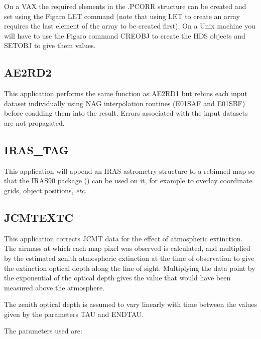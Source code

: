 On a VAX the required elements in the .PCORR structure can be created and
set using the Figaro LET command (note that using LET to create an array 
requires the last element of the array to be created first). On a Unix machine
you will have to use the Figaro command CREOBJ to create the HDS objects and
SETOBJ to give them values.


\goodbreak

\subsection{AE2RD2}

This application performs the same function as AE2RD1 but rebins each
input dataset individually using NAG interpolation routines (E01SAF
and E01SBF) before coadding them into the result. Errors associated
with the input datasets are not propagated.


\goodbreak

\subsection{IRAS\_TAG}

This application will append an IRAS astrometry structure to a 
rebinned map so that the IRAS90 package
() can be used on it,
for example to overlay coordinate grids, object positions, {\em etc}.


\goodbreak

\subsection{JCMTEXTC}

This application corrects JCMT data for the effect of  atmospheric
extinction. The airmass at which each map pixel was  observed is
calculated, and multiplied by the estimated zenith  atmospheric
extinction at the time of observation to give the  extinction optical
depth along the line of sight. Multiplying the data point by the
exponential of the optical depth gives  the value that would have been
measured above the atmosphere. 

The zenith optical depth is assumed to vary linearly with  time
between the values given by the parameters TAU and ENDTAU.

\goodbreak

The parameters used are:

